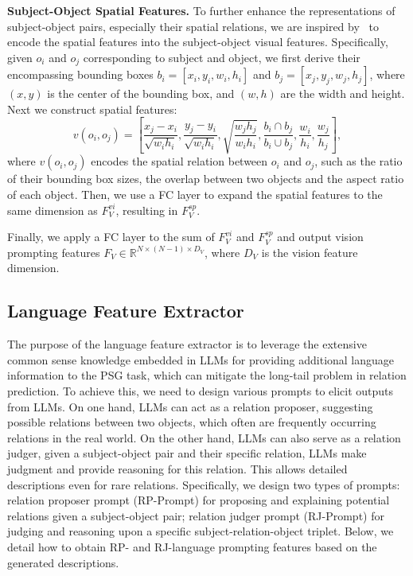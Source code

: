 \noindent \textbf{Subject-Object Spatial Features.}
To further enhance the representations of subject-object pairs, especially their spatial relations,  we are inspired by~\citet{peyre2017weakly} to encode the spatial features into the subject-object visual features.
Specifically, given $o_i$ and $o_j$ corresponding to subject and object, we first derive their encompassing bounding boxes $b_i=[x_i, y_i, w_i, h_i]$ and $b_j=[x_j, y_j, w_j, h_j]$, where $(x, y)$ is the center of the bounding box, and $(w, h)$ are the width and height.
Next we construct spatial features: 
\begin{equation}
    v(o_i, o_j) = [\frac{x_{j} - x_{i}}{\sqrt{w_{i}h_{i}}}, \frac{y_{j} - y_{i}}{\sqrt{w_{i}h_{i}}}, \sqrt{\frac{w_{j}h_{j}}{w_{i}h_{i}}}, \frac{b_i \cap b_j}{b_i \cup b_j}, \frac{w_i}{h_i}, \frac{w_j}{h_j}],
\end{equation}
where $v(o_i, o_j)$ encodes the spatial relation between $o_i$ and $o_j$, such as the ratio of their bounding box sizes, the overlap between two objects and the aspect ratio of each object.
Then, we use a FC layer to expand the spatial features to the same dimension as $F_{V}^{vi}$, resulting in $F_{V}^{sp}$.

Finally, we apply a FC layer to the sum of $F_{V}^{vi}$ and $F_{V}^{sp}$ and output vision prompting features $F_V \in \mathbb{R}^{N \times (N-1) \times D_{V}}$, where $D_{V}$ is the vision feature dimension.


\subsection{Language Feature Extractor}
\label{vlprompt:sec:language_feature_extractor}

The purpose of the language feature extractor is to leverage the extensive common sense knowledge embedded in LLMs for providing additional language information to the PSG task, which can mitigate the long-tail problem in relation prediction.
To achieve this, we need to design various prompts to elicit outputs from LLMs.
On one hand, LLMs can act as a relation proposer, suggesting possible relations between two objects, which often are frequently occurring relations in the real world.
On the other hand, LLMs can also serve as a relation judger, given a subject-object pair and their specific relation, LLMs make judgment and provide reasoning for this relation. This allows detailed descriptions even for rare relations.
Specifically, we design two types of prompts: relation proposer prompt (RP-Prompt) for proposing and explaining potential relations given a subject-object pair; relation judger prompt (RJ-Prompt) for judging and reasoning  upon a specific subject-relation-object triplet. 
Below, we detail how to obtain RP- and RJ-language prompting features based on the generated descriptions.

